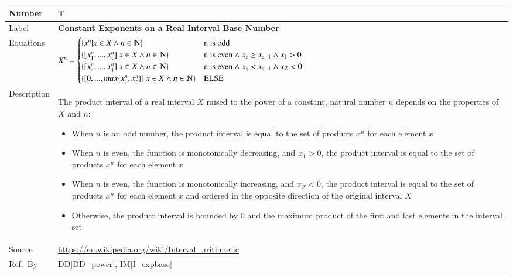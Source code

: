\documentclass[12pt]{article}
\newcommand{\colAwidth}{0.13\textwidth}
\newcommand{\colBwidth}{0.82\textwidth}
\newcommand{\ddref}[1]{DD\ref{#1}}
\newcounter{theorynum} %
\newcommand{\iref}[1]{IM\ref{#1}}
\begin{document}
\noindent
\begin{minipage}{\textwidth}
	\renewcommand*{\arraystretch}{1.5}
	\begin{tabular}{| p{\colAwidth} | p{\colBwidth}|}
		\hline
		\rowcolor[gray]{0.9}
		Number& T{theorynum}\thetheorynum 
		\label{T_expbase}\\
		\hline
		Label&\bf Constant Exponents on a Real Interval Base 
		Number\\
		\hline
		Equations &  $X^n = \begin{cases}
			\{x^n | x \in X \wedge n 
			\in \varmathbb{N}\} & \text{n is odd}\\
			\{[x_{1}^n,...,x_{z}^n] | x \in X \wedge n 
			\in \varmathbb{N}\} & \text{n is even}\wedge x_{z} \geq x_{z+1} 
			\wedge x_{1} > 0\\
			\{[x_{z}^n,...,x_{1}^n] | x \in X \wedge n 
			\in \varmathbb{N}\} & \text{n is even} \wedge x_{z} < x_{z+1} 
			\wedge x_{Z} < 0\\
			\{[0,...,max\{x_{1}^n,x_{z}^n\}] | x \in X \wedge n 
			\in \varmathbb{N}\} & \text{ELSE}\\
		\end{cases}$
		\newline
		\\
		\hline
		Description & The product interval of a real interval $X$ 
		raised to the power of a constant, natural number $n$ depends on the 
		properties of $X$ and $n$:
		\begin{itemize}
			\item When $n$ is an odd number, the product interval is equal to 
			the set of products $x^n$ for each element $x$
			\item When $n$ is even, the function is monotonically decreasing, 
			and $x_{1} > 0$, the product interval is equal to the set of 
			products $x^n$ for each element $x$
			\item When $n$ is even, the function is monotonically increasing, 
			and $x_{Z} < 0$, the product interval is equal to the set of 
			products $x^n$ for each element $x$ and ordered in the opposite 
			direction of the original interval $X$
			\item Otherwise, the product interval is bounded by $0$ and the 
			maximum product of the first and last elements in the interval set
		\end{itemize}\\
		\hline
		Source & \url{https://en.wikipedia.org/wiki/Interval_arithmetic}\\
		\hline
		Ref.\ By & \ddref{DD_power}, \iref{I_expbase}\\
		\hline
	\end{tabular}
\end{minipage}\\
\end{document}
